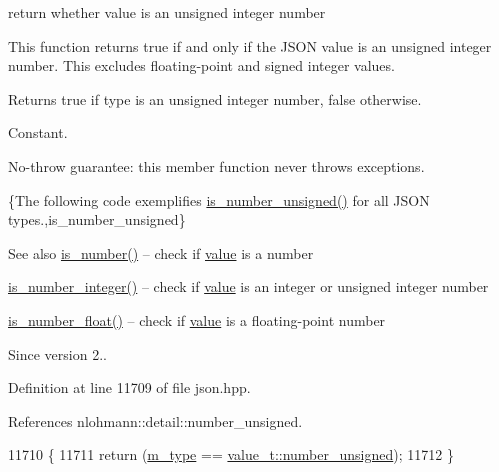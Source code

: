 return whether value is an unsigned integer number 

This function returns true if and only if the J\+S\+ON value is an unsigned integer number. This excludes floating-\/point and signed integer values.

\begin{DoxyReturn}{Returns}
{\ttfamily true} if type is an unsigned integer number, {\ttfamily false} otherwise.
\end{DoxyReturn}
Constant.

No-\/throw guarantee\+: this member function never throws exceptions.

\{The following code exemplifies {\ttfamily \hyperlink{classnlohmann_1_1basic__json_abc7378cba0613a78b9aad1c8e7044bb0}{is\+\_\+number\+\_\+unsigned()}} for all J\+S\+ON types.,is\+\_\+number\+\_\+unsigned\}

\begin{DoxySeeAlso}{See also}
\hyperlink{classnlohmann_1_1basic__json_a2b9852390abb4b1ef5fac6984e2fc0f3}{is\+\_\+number()} -- check if \hyperlink{classnlohmann_1_1basic__json_adcf8ca5079f5db993820bf50036bf45d}{value} is a number 

\hyperlink{classnlohmann_1_1basic__json_abac8af76067f1e8fdca9052882c74428}{is\+\_\+number\+\_\+integer()} -- check if \hyperlink{classnlohmann_1_1basic__json_adcf8ca5079f5db993820bf50036bf45d}{value} is an integer or unsigned integer number 

\hyperlink{classnlohmann_1_1basic__json_a33b4bf898b857c962e798fc7f6e86e70}{is\+\_\+number\+\_\+float()} -- check if \hyperlink{classnlohmann_1_1basic__json_adcf8ca5079f5db993820bf50036bf45d}{value} is a floating-\/point number
\end{DoxySeeAlso}
\begin{DoxySince}{Since}
version 2.. 
\end{DoxySince}


Definition at line 11709 of file json.\+hpp.



References nlohmann\+::detail\+::number\+\_\+unsigned.


\begin{DoxyCode}
11710     \{
11711         \textcolor{keywordflow}{return} (\hyperlink{classnlohmann_1_1basic__json_a91990b60d7d4d67968a2c1db677536e7}{m\_type} == \hyperlink{namespacenlohmann_1_1detail_a1ed8fc6239da25abcaf681d30ace4985adce7cc8ec29055c4158828921f2f265e}{value\_t::number\_unsigned});
11712     \}
\end{DoxyCode}
\mbox{\label{classnlohmann_1_1basic__json_af8f511af124e82e4579f444b4175787c}} 
